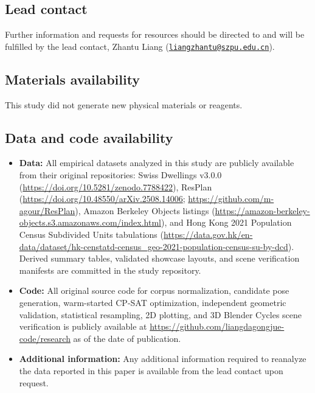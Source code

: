\documentclass[12pt,letterpaper]{article}
\newcommand{\SubmissionCite}[1]{\unskip\citep{#1}}
\providecommand{\tightlist}{\setlength{\itemsep}{0pt}\setlength{\parskip}{0pt}}
\begin{document}
\subsection{Lead contact}\label{lead-contact}

Further information and requests for resources should be directed to and will be fulfilled by the lead contact, Zhantu Liang (\href{mailto:liangzhantu@szpu.edu.cn}{\nolinkurl{liangzhantu@szpu.edu.cn}}).

\subsection{Materials availability}\label{materials-availability}

This study did not generate new physical materials or reagents.

\subsection{Data and code availability}\label{data-and-code-availability}

\begin{itemize}
\tightlist
\item
  \textbf{Data:} All empirical datasets analyzed in this study are publicly available from their original repositories: Swiss Dwellings v3.0.0 \SubmissionCite{standfest2022swiss} (\url{https://doi.org/10.5281/zenodo.7788422}), ResPlan \SubmissionCite{abouagour2025resplan} (\url{https://doi.org/10.48550/arXiv.2508.14006}; \url{https://github.com/m-agour/ResPlan}), Amazon Berkeley Objects listings (\url{https://amazon-berkeley-objects.s3.amazonaws.com/index.html}), and Hong Kong 2021 Population Census Subdivided Units tabulations (\url{https://data.gov.hk/en-data/dataset/hk-censtatd-census_geo-2021-population-census-su-by-dcd}). Derived summary tables, validated showcase layouts, and scene verification manifests are committed in the study repository.
\item
  \textbf{Code:} All original source code for corpus normalization, candidate pose generation, warm-started CP-SAT optimization, independent geometric validation, statistical resampling, 2D plotting, and 3D Blender Cycles scene verification is publicly available at \url{https://github.com/liangdagongjue-code/research} as of the date of publication.
\item
  \textbf{Additional information:} Any additional information required to reanalyze the data reported in this paper is available from the lead contact upon request.
\end{itemize}
\end{document}
